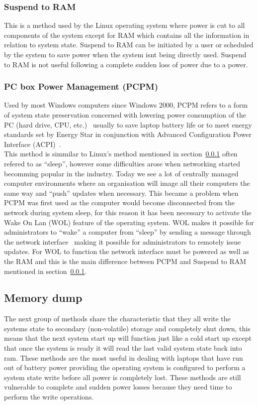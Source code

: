 \documentclass[a4,12pt]{article}
\begin{document}
\subsubsection{Suspend to RAM}\label{sec:stRam}
This is a method used by the Linux operating system where power is cut to all components of the system except for RAM which contains all the information in relation to system state.\citep{Wiki}
Suspend to RAM can be initiated by a user or scheduled by the system to save power when the system isnt being directly used. Suspend to RAM is not useful following a complete sudden loss of power due to a power.
\subsubsection{PC box Power Management (PCPM)}
Used by most Windows computers since Windows 2000, PCPM refers to a form of system state preservation concerned with lowering power consumption of the PC (hard drive, CPU, etc.)~\citep{PCPM} usually to save laptop battery life or to meet energy standards set by Energy Star in conjunction with Advanced Configuration Power Interface (ACPI)~\citep{PCPM}.
\\This method is simmilar to Linux's method mentioned in section~\ref{sec:stRam} often refered to as ``sleep'', however some difficulties arose when networking started becomming popular in the industry. Today we see a lot of centrally managed computer environments where an organisation will image all their computers the same way and ``push'' updates when necessary. This became a problem when PCPM was first used as the computer would become disconnected from the network during system sleep, for this reason it has been necessary to activate the Wake On Lan (WOL) feature of the operating system. WOL makes it possible for administrators to ``wake'' a computer from ``sleep'' by sending a message through the network interface~\citep{WOL} making it possible for administrators to remotely issue updates. For WOL to function the network interface must be powered as well as the RAM and this is the main difference between PCPM and Suspend to RAM mentioned in section~\ref{sec:stRam}.

\subsection{Memory dump}\label{sec:memorydump}
The next group of methods share the characteristic that they all write the systems state to secondary (non-volatile) storage and completely shut down, this means that the next system start up will function just like a cold start up except that once the system is ready it will read the last valid system state back into ram.
These methods are the most useful in dealing with laptops that have run out of battery power providing the operating system is configured to perform a system state write before all power is completely lost. These methods are still vulnerable to complete and sudden power losses because they need time to perform the write operations.
\end{document}
